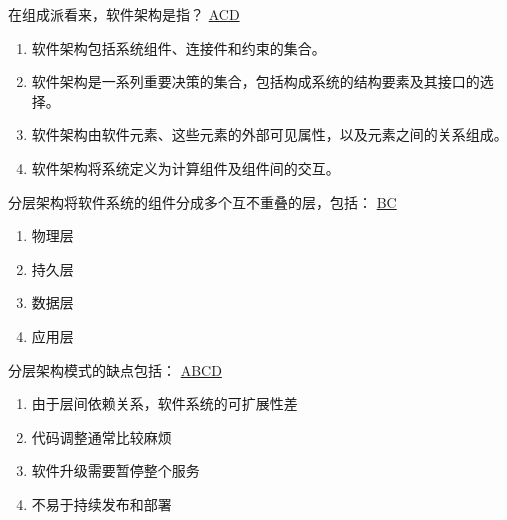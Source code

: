 \begin{problem}
	在组成派看来，软件架构是指？
	\uline{ACD}    
        \begin{enumerate}[label=\Alph*.]
            \item 软件架构包括系统组件、连接件和约束的集合。
            \item 软件架构是一系列重要决策的集合，包括构成系统的结构要素及其接口的选择。
            \item 软件架构由软件元素、这些元素的外部可见属性，以及元素之间的关系组成。
            \item 软件架构将系统定义为计算组件及组件间的交互。
        \end{enumerate}
\end{problem}



\begin{problem}
	分层架构将软件系统的组件分成多个互不重叠的层，包括：
	\uline{BC}    
    \vspace{-0.8em}
    \begin{multicols}{4}
        \begin{enumerate}[label=\Alph*.]
            \item 物理层
            \item 持久层
            \item 数据层
            \item 应用层
        \end{enumerate}
    \end{multicols}
    \vspace{-1em}
\end{problem}



\begin{problem}
	分层架构模式的缺点包括：
	\uline{ABCD}    
    \vspace{-0.8em}
    \begin{multicols}{2}
        \begin{enumerate}[label=\Alph*.]
            \item 由于层间依赖关系，软件系统的可扩展性差
            \item 代码调整通常比较麻烦
            \item 软件升级需要暂停整个服务
            \item 不易于持续发布和部署
        \end{enumerate}
    \end{multicols}
    \vspace{-1em}
\end{problem}




